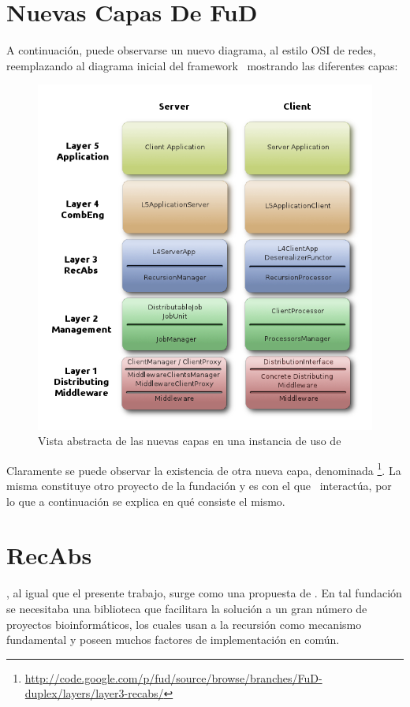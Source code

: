 	\section{Nuevas Capas De FuD}
		A continuaci\'on, puede observarse un nuevo diagrama, al estilo OSI de redes, reemplazando al diagrama inicial del framework \fud \ 
		mostrando las diferentes capas:
    \begin{figure}[H] \hspace{.30cm}
        \includegraphics[scale=.51]{images/AbstractLayersRedesigned.png}
	         \caption{Vista abstracta de las nuevas capas en una instancia de uso de \fud}
	         \label{redisenioFud}
    \end{figure}
		
    Claramente se puede observar la existencia de otra nueva capa, denominada \recabs
    \footnote{\url{http://code.google.com/p/fud/source/browse/branches/FuD-duplex/layers/layer3-recabs/}}. La misma constituye otro proyecto de la
    fundaci\'on y es con el que \combeng \ interact\'ua, por lo que a continuaci\'on se explica en qu\'e consiste el mismo.
		
		\section{RecAbs}
			\recabs, al igual que el presente trabajo, surge como una propuesta de \fudepan. En tal fundaci\'on se necesitaba una biblioteca que facilitara
      la soluci\'on a un gran n\'umero de proyectos bioinform\'aticos, los cuales usan a la recursi\'on como mecanismo fundamental y poseen muchos
      factores de implementaci\'on en com\'un.

